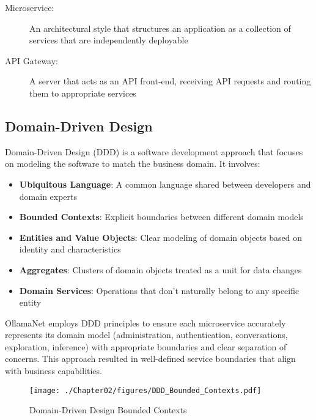 \begin{terminology}
\begin{description}
    \item[Microservice:] An architectural style that structures an application as a collection of services that are independently deployable
    \item[API Gateway:] A server that acts as an API front-end, receiving API requests and routing them to appropriate services
\end{description}
\end{terminology}

\subsection{Domain-Driven Design}

Domain-Driven Design (DDD) is a software development approach that focuses on modeling the software to match the business domain. It involves:

\begin{itemize}
    \item \textbf{Ubiquitous Language}: A common language shared between developers and domain experts
    \item \textbf{Bounded Contexts}: Explicit boundaries between different domain models
    \item \textbf{Entities and Value Objects}: Clear modeling of domain objects based on identity and characteristics
    \item \textbf{Aggregates}: Clusters of domain objects treated as a unit for data changes
    \item \textbf{Domain Services}: Operations that don't naturally belong to any specific entity
\end{itemize}

OllamaNet employs DDD principles to ensure each microservice accurately represents its domain model (administration, authentication, conversations, exploration, inference) with appropriate boundaries and clear separation of concerns. This approach resulted in well-defined service boundaries that align with business capabilities.

\begin{sidewaysfigure}[p]
    \centering
    \texttt{[image: ./Chapter02/figures/DDD\_Bounded\_Contexts.pdf]}
    \caption{Domain-Driven Design Bounded Contexts}
    \label{fig:ddd-contexts}
\end{sidewaysfigure}
\clearpage

